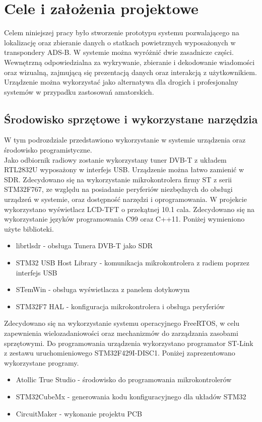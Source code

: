 \documentclass[eng,printmode]{mgr}
\begin{document}
\chapter{ Cele i założenia projektowe }
Celem niniejszej pracy było stworzenie prototypu systemu pozwalającego na lokalizację oraz zbieranie danych o statkach powietrznych wyposażonych w transpondery ADS-B. W systemie można wyróżnić dwie zasadnicze części.
Wewnętrzną odpowiedzialna za wykrywanie, zbieranie i dekodowanie wiadomości oraz wizualną, zajmującą się prezentacją danych oraz interakcją z użytkownikiem. Urządzenie można wykorzystać jako alternatywa dla drogich i profesjonalny systemów w przypadku zastosowań amatorskich.

\section{Środowisko sprzętowe i wykorzystane narzędzia}
W tym podrozdziale przedstawiono wykorzystanie w systemie urządzenia oraz środowisko programistyczne.
\\


Jako odbiornik radiowy zostanie wykorzystany tuner DVB-T z układem RTL2832U wyposażony w interfejs USB. Urządzenie można łatwo zamienić w SDR. Zdecydowano się na wykorzystanie mikrokontrolera firmy ST z serii STM32F767, ze względu na posiadanie peryferiów niezbędnych do obsługi urządzeń w systemie, oraz dostępność narzędzi i oprogramowania. W projekcie wykorzystano wyświetlacz LCD-TFT o przekątnej 10.1 cala.
Zdecydowano się na wykorzystanie języków programowania C99 oraz C++11.
Poniżej wymieniono użyte biblioteki.
\begin{itemize}
  \item librtlsdr - obsługa Tunera DVB-T jako SDR
  \item STM32 USB Host Library - komunikacja mikrokontrolera z radiem poprzez interfejs USB
  \item STemWin - obsługa wyświetlacza z panelem dotykowym
  \item STM32F7 HAL - konfiguracja mikrokontrolera i obsługa peryferiów
\end{itemize}


Zdecydowano się na wykorzystanie systemu operacyjnego FreeRTOS, w celu zapewnienia wielozadaniowości oraz mechanizmów do zarządzania zasobami sprzętowymi. Do programowania urządzenia wykorzystano programator ST-Link z zestawu uruchomieniowego STM32F429I-DISC1. Poniżej zaprezentowano wykorzystane programy.

\begin{itemize}
  \item Atollic True Studio - środowisko do programowania mikrokontrolerów
  \item STM32CubeMx - generowania kodu konfiguracyjnego dla układów STM32
  \item CircuitMaker - wykonanie projektu PCB
\end{itemize}
\end{document}
